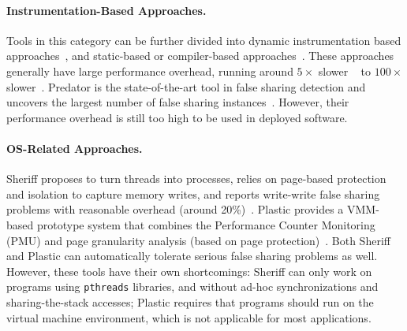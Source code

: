 \paragraph{Instrumentation-Based Approaches.} Tools in this category can be further divided into dynamic instrumentation based approaches~\cite{falseshare:binaryinstrumentation1, falseshare:binaryinstrumentation2, qinzhao}, and static-based or compiler-based approaches~\cite{Predator}.
These approaches generally have large performance overhead, running around $5\times$ slower ~\cite{qinzhao, Predator} to $100\times$ slower~\cite{falseshare:binaryinstrumentation1, falseshare:binaryinstrumentation2}. Predator is the state-of-the-art tool in false sharing detection and uncovers the largest number of false sharing instances~\cite{Predator}. However, their performance overhead is still too high to be used in deployed software. 


\paragraph{OS-Related Approaches.} Sheriff proposes to turn threads into processes, relies on page-based protection and isolation to capture memory writes, and reports write-write false sharing problems with reasonable overhead (around 20\%)~\cite{Sheriff}. Plastic provides a VMM-based prototype system that combines the Performance Counter Monitoring (PMU) and page granularity analysis (based on page protection)~\cite{OSdetection}. Both Sheriff and Plastic can automatically tolerate serious false sharing problems as well. However, these tools have their own shortcomings: Sheriff can only work on programs using \texttt{pthreads} libraries, and without ad-hoc synchronizations and sharing-the-stack accesses; Plastic requires that programs should run on the virtual machine environment, which is not applicable for most applications.   

